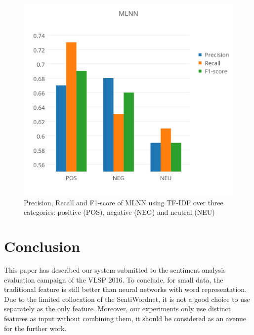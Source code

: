 \documentclass[conference,compsoc]{IEEEtran}
\begin{document}
\begin{figure}[t]
        \centering
        \caption{Precision, Recall and F1-score of MLNN using TF-IDF over three categories: positive (POS), negative (NEG) and neutral (NEU)}
        \label{fig-mlnn}
        \includegraphics[scale=0.25]{./png/MLNN-vlsp}
\end{figure}


    
\section{Conclusion}
This paper has described our system submitted to the sentiment analysis evaluation campaign of the VLSP 2016. To conclude, for small data, the traditional feature is still better than neural networks with word representation.
Due to the limited collocation of the SentiWordnet, it is not a good choice to use separately as the only feature. Moreover, our experiments only use distinct features as input without combining them, it should be considered as an avenue for the further work.











\end{document}
